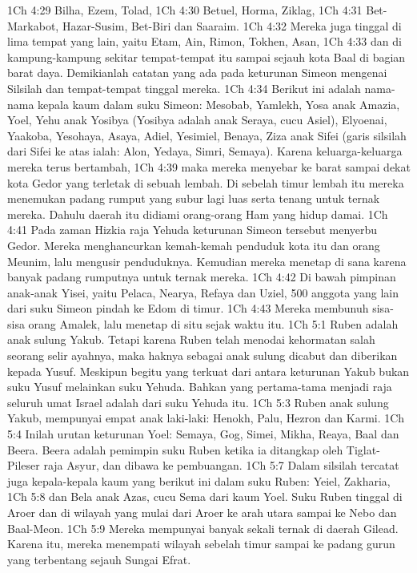 1Ch 4:29  Bilha, Ezem, Tolad,
1Ch 4:30  Betuel, Horma, Ziklag,
1Ch 4:31  Bet-Markabot, Hazar-Susim, Bet-Biri dan Saaraim.
1Ch 4:32  Mereka juga tinggal di lima tempat yang lain, yaitu Etam, Ain, Rimon, Tokhen, Asan,
1Ch 4:33  dan di kampung-kampung sekitar tempat-tempat itu sampai sejauh kota Baal di bagian barat daya. Demikianlah catatan yang ada pada keturunan Simeon mengenai Silsilah dan tempat-tempat tinggal mereka.
1Ch 4:34  Berikut ini adalah nama-nama kepala kaum dalam suku Simeon: Mesobab, Yamlekh, Yosa anak Amazia, Yoel, Yehu anak Yosibya (Yosibya adalah anak Seraya, cucu Asiel), Elyoenai, Yaakoba, Yesohaya, Asaya, Adiel, Yesimiel, Benaya, Ziza anak Sifei (garis silsilah dari Sifei ke atas ialah: Alon, Yedaya, Simri, Semaya). Karena keluarga-keluarga mereka terus bertambah,
1Ch 4:39  maka mereka menyebar ke barat sampai dekat kota Gedor yang terletak di sebuah lembah. Di sebelah timur lembah itu mereka menemukan padang rumput yang subur lagi luas serta tenang untuk ternak mereka. Dahulu daerah itu didiami orang-orang Ham yang hidup damai.
1Ch 4:41  Pada zaman Hizkia raja Yehuda keturunan Simeon tersebut menyerbu Gedor. Mereka menghancurkan kemah-kemah penduduk kota itu dan orang Meunim, lalu mengusir penduduknya. Kemudian mereka menetap di sana karena banyak padang rumputnya untuk ternak mereka.
1Ch 4:42  Di bawah pimpinan anak-anak Yisei, yaitu Pelaca, Nearya, Refaya dan Uziel, 500 anggota yang lain dari suku Simeon pindah ke Edom di timur.
1Ch 4:43  Mereka membunuh sisa-sisa orang Amalek, lalu menetap di situ sejak waktu itu.
1Ch 5:1  Ruben adalah anak sulung Yakub. Tetapi karena Ruben telah menodai kehormatan salah seorang selir ayahnya, maka haknya sebagai anak sulung dicabut dan diberikan kepada Yusuf. Meskipun begitu yang terkuat dari antara keturunan Yakub bukan suku Yusuf melainkan suku Yehuda. Bahkan yang pertama-tama menjadi raja seluruh umat Israel adalah dari suku Yehuda itu.
1Ch 5:3  Ruben anak sulung Yakub, mempunyai empat anak laki-laki: Henokh, Palu, Hezron dan Karmi.
1Ch 5:4  Inilah urutan keturunan Yoel: Semaya, Gog, Simei, Mikha, Reaya, Baal dan Beera. Beera adalah pemimpin suku Ruben ketika ia ditangkap oleh Tiglat-Pileser raja Asyur, dan dibawa ke pembuangan.
1Ch 5:7  Dalam silsilah tercatat juga kepala-kepala kaum yang berikut ini dalam suku Ruben: Yeiel, Zakharia,
1Ch 5:8  dan Bela anak Azas, cucu Sema dari kaum Yoel. Suku Ruben tinggal di Aroer dan di wilayah yang mulai dari Aroer ke arah utara sampai ke Nebo dan Baal-Meon.
1Ch 5:9  Mereka mempunyai banyak sekali ternak di daerah Gilead. Karena itu, mereka menempati wilayah sebelah timur sampai ke padang gurun yang terbentang sejauh Sungai Efrat.
